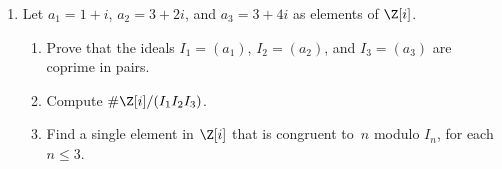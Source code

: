 \begin{enumerate}




\item Let $a_1 = 1+i$, $a_2 = 3+2i$, and $a_3 = 3+4i$ as elements of 
$\Z[i]$. 
\begin{enumerate}
\item Prove that the ideals $I_1=(a_1)$, $I_2=(a_2)$, and $I_3=(a_3)$
are coprime in pairs.
\item Compute $\#\Z[i]/(I_1 I_2 I_3)$.
\item Find a single element in $\Z[i]$ that is congruent to~$n$ modulo $I_n$, 
for each $n\leq 3$.
\end{enumerate}

%
%


\end{enumerate}
